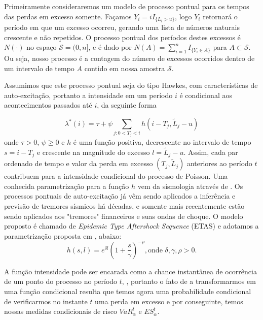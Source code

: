 \documentclass[review]{elsarticle}
\theoremstyle{definition}
\begin{document}
Primeiramente consideraremos um modelo de processo pontual para os tempos das perdas em excesso somente. Façamos $Y_i=i I_{\{L_i>u\}}$, logo $Y_i$ retornará o período em que um excesso ocorreu, gerando uma lista de números naturais crescente e não repetidos. O processo pontual dos períodos destes excessos é $N(\cdot)$ no espaço $\mathcal{S}=(0, n]$, e é dado por $N(A)=\sum_{i=1}^{n}I_{\{Y_i\in A\}}$ para $A \subset \mathcal{S}$. Ou seja, nosso processo é a contagem do número de excessos ocorridos dentro de um intervalo de tempo $A$ contido em nossa amostra $\mathcal{S}$.

Assumimos que este processo pontual seja do tipo Hawkes, com características de auto-excitação, portanto a intensidade em um período $i$ é condicional aos acontecimentos passados até $i$, da seguinte forma

\begin{equation}
\label{eq:condintensity}
\lambda^*(i)=\tau + \psi \displaystyle\sum_{j:0<T_j<i}h(i-T_j, \tilde{L}_j -u)
\end{equation}
onde $\tau>0$, $\psi \geq 0$ e $h$ é uma função positiva, decrescente no intervalo de tempo $s=i-T_j$ e crescente na magnitude do excesso $l=\tilde{L}_j-u$. Assim, cada par ordenado de tempo e valor da perda em excesso $(T_j, \tilde{L}_j)$ anteriores ao período $t$ contribuem para a intensidade condicional do processo de Poisson. Uma conhecida parametrização para a função $h$ vem da sismologia através de \cite{Ogata1988}. Os processos pontuais de auto-excitação já vêm sendo aplicados a inferência e previsão de tremores sísmicos há décadas, e somente mais recentemente estão sendo aplicados aos "tremores"  financeiros e suas ondas de choque. O modelo proposto é chamado de \emph{Epidemic Type Aftershock Sequence} (ETAS) e adotamos a parametrização proposta em \cite{Harte2010}, abaixo:
\begin{equation*}
\label{eq:hsl}
h(s, l)=e^{\delta l}\left(1+\frac{s}{\gamma}\right)^{-\rho}, \text{onde } \delta, \gamma, \rho > 0.
\end{equation*}

A função intensidade pode ser encarada como a chance instantânea de ocorrência de um ponto do processo no período $t$, \cite{Chiu2013}, portanto o fato de a transformarmos em uma função condicional resulta que temos agora uma probabilidade condicional de verificarmos no instante $t$ uma perda em excesso e por conseguinte, temos nossas medidas condicionais de risco $VaR_\alpha^t$ e $ES_\alpha^t$.
\end{document}
